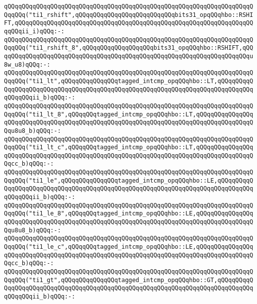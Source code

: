 \newline
\verb|qQQqqQQqqQQqqQQqqQQqqQQqqQQqqQQqqQQqqQQqqQQqqQQqqQQqqQQqqQQqqQQqqQQqqQQqqQQq("ti1_rshift",qQQqqQQqqQQqqQQqqQQqqQQqqQQqbits31_opqQQqhbo::RSHIFT,qQQqqQQqqQQqqQQqqQQqqQQqqQQqqQQqqQQqqQQqqQQqqQQqqQQqqQQqqQQqqQQqqQQqqQQqii_i)qQQq:-:|\newline
\verb|qQQqqQQqqQQqqQQqqQQqqQQqqQQqqQQqqQQqqQQqqQQqqQQqqQQqqQQqqQQqqQQqqQQqqQQqqQQq("ti1_rshift_8",qQQqqQQqqQQqqQQqqQQqbits31_opqQQqhbo::RSHIFT,qQQqqQQqqQQqqQQqqQQqqQQqqQQqqQQqqQQqqQQqqQQqqQQqqQQqqQQqqQQqqQQqqQQqqQQqu8w_u8)qQQq:-:|\newline
\newline
\verb|qQQqqQQqqQQqqQQqqQQqqQQqqQQqqQQqqQQqqQQqqQQqqQQqqQQqqQQqqQQqqQQqqQQqqQQqqQQq("ti1_lt",qQQqqQQqqQQqqQQqtagged_intcmp_opqQQqhbo::LT,qQQqqQQqqQQqqQQqqQQqqQQqqQQqqQQqqQQqqQQqqQQqqQQqqQQqqQQqqQQqqQQqqQQqqQQqqQQqqQQqqQQqqQQqii_b)qQQq:-:|\newline
\verb|qQQqqQQqqQQqqQQqqQQqqQQqqQQqqQQqqQQqqQQqqQQqqQQqqQQqqQQqqQQqqQQqqQQqqQQqqQQq("ti1_lt_8",qQQqqQQqtagged_intcmp_opqQQqhbo::LT,qQQqqQQqqQQqqQQqqQQqqQQqqQQqqQQqqQQqqQQqqQQqqQQqqQQqqQQqqQQqqQQqqQQqqQQqqQQqqQQqqQQqqQQqu8u8_b)qQQq:-:|\newline
\verb|qQQqqQQqqQQqqQQqqQQqqQQqqQQqqQQqqQQqqQQqqQQqqQQqqQQqqQQqqQQqqQQqqQQqqQQqqQQq("ti1_lt_c",qQQqqQQqtagged_intcmp_opqQQqhbo::LT,qQQqqQQqqQQqqQQqqQQqqQQqqQQqqQQqqQQqqQQqqQQqqQQqqQQqqQQqqQQqqQQqqQQqqQQqqQQqqQQqqQQqqQQqcc_b)qQQq:-:|\newline
\newline
\verb|qQQqqQQqqQQqqQQqqQQqqQQqqQQqqQQqqQQqqQQqqQQqqQQqqQQqqQQqqQQqqQQqqQQqqQQqqQQq("ti1_le",qQQqqQQqqQQqqQQqtagged_intcmp_opqQQqhbo::LE,qQQqqQQqqQQqqQQqqQQqqQQqqQQqqQQqqQQqqQQqqQQqqQQqqQQqqQQqqQQqqQQqqQQqqQQqqQQqqQQqqQQqqQQqii_b)qQQq:-:|\newline
\verb|qQQqqQQqqQQqqQQqqQQqqQQqqQQqqQQqqQQqqQQqqQQqqQQqqQQqqQQqqQQqqQQqqQQqqQQqqQQq("ti1_le_8",qQQqqQQqtagged_intcmp_opqQQqhbo::LE,qQQqqQQqqQQqqQQqqQQqqQQqqQQqqQQqqQQqqQQqqQQqqQQqqQQqqQQqqQQqqQQqqQQqqQQqqQQqqQQqqQQqqQQqu8u8_b)qQQq:-:|\newline
\verb|qQQqqQQqqQQqqQQqqQQqqQQqqQQqqQQqqQQqqQQqqQQqqQQqqQQqqQQqqQQqqQQqqQQqqQQqqQQq("ti1_le_c",qQQqqQQqtagged_intcmp_opqQQqhbo::LE,qQQqqQQqqQQqqQQqqQQqqQQqqQQqqQQqqQQqqQQqqQQqqQQqqQQqqQQqqQQqqQQqqQQqqQQqqQQqqQQqqQQqqQQqcc_b)qQQq:-:|\newline
\newline
\verb|qQQqqQQqqQQqqQQqqQQqqQQqqQQqqQQqqQQqqQQqqQQqqQQqqQQqqQQqqQQqqQQqqQQqqQQqqQQq("ti1_gt",qQQqqQQqqQQqqQQqtagged_intcmp_opqQQqhbo::GT,qQQqqQQqqQQqqQQqqQQqqQQqqQQqqQQqqQQqqQQqqQQqqQQqqQQqqQQqqQQqqQQqqQQqqQQqqQQqqQQqqQQqqQQqii_b)qQQq:-:|\newline
